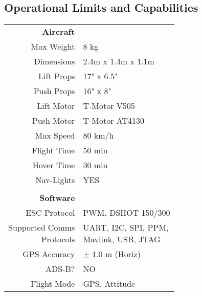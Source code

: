 \subsection{Operational Limits and Capabilities}
\label{sec:limits-and-capabilities}

\begin{table}[H]
\parbox[t][][t]{.45\linewidth}{
\centering
{
\renewcommand{\arraystretch}{2.0}
\begin{tabular}{r|l}
\color{hyperrideblue} \textbf{Aircraft} & \textbf{} \\
Max Weight & 8 kg \\
Dimensions & 2.4m x 1.4m x 1.1m \\
Lift Props & 17" x 6.5" \\
Push Props & 16" x 8" \\
Lift Motor & T-Motor V505 \\
Push Motor & T-Motor AT4130 \\
Max Speed & 80 km/h \\
Flight Time & 50 min \\
Hover Time & 30 min \\
Nav-Lights & YES \\
			&               \\
\color{hyperrideblue} \textbf{Software} &  \\
ESC Protocol & PWM, DSHOT 150/300 \\
\Longunderstack[r]{Supported Comms\\Protocols} & \Longunderstack[l]{UART, I2C, SPI, PPM,\\Mavlink, USB, JTAG} \\
GPS Accuracy & $\pm$ 1.0 m (Horiz) \\
ADS-B? & NO \\
Flight Mode & GPS, Attitude \\


\end{tabular}}}
\end{table}

